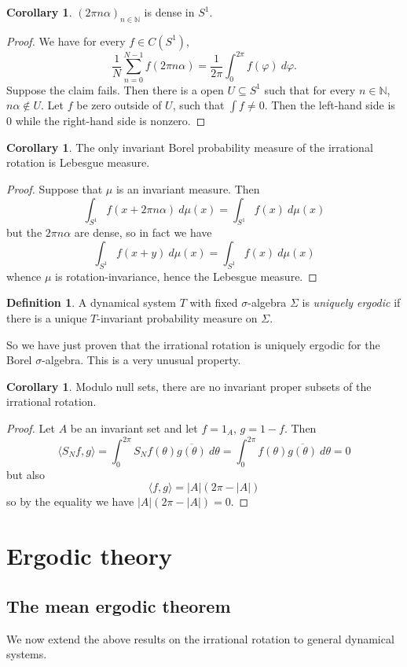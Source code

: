 \documentclass[12pt]{report}
\newcommand{\NN}{\mathbb{N}}
\newcommand{\dfn}[1]{\emph{#1}\index{#1}}
\theoremstyle{definition}
\newtheorem{corollary}[theorem]{Corollary}
\newtheorem{definition}[theorem]{Definition}
\begin{document}
\begin{corollary}
$(2\pi n\alpha)_{n \in \NN}$ is dense in $S^1$.
\end{corollary}
\begin{proof}
We have for every $f \in C(S^1)$,
$$\frac{1}{N} \sum_{n=0}^{N-1} f(2\pi n\alpha) = \frac{1}{2\pi} \int_0^{2\pi} f(\varphi) ~d\varphi.$$
Suppose the claim fails. Then there is a open $U \subseteq S^1$ such that for every $n \in \NN$, $n\alpha \notin U$. Let $f$ be zero outside of $U$, such that $\int f \neq 0$. Then the left-hand side is $0$ while the right-hand side is nonzero.
\end{proof}
\begin{corollary}
The only invariant Borel probability measure of the irrational rotation is Lebesgue measure.
\end{corollary}
\begin{proof}
Suppose that $\mu$ is an invariant measure. Then
$$\int_{S^1} f(x + 2\pi n\alpha) ~d\mu(x) = \int_{S^1} f(x) ~d\mu(x)$$
but the $2\pi n\alpha$ are dense, so in fact we have
$$\int_{S^1} f(x + y) ~d\mu(x) = \int_{S^1} f(x) ~d\mu(x)$$
whence $\mu$ is rotation-invariance, hence the Lebesgue measure.
\end{proof}
\begin{definition}
A dynamical system $T$ with fixed $\sigma$-algebra $\Sigma$ is \dfn{uniquely ergodic} if there is a unique $T$-invariant probability measure on $\Sigma$.
\end{definition}
So we have just proven that the irrational rotation is uniquely ergodic for the Borel $\sigma$-algebra. This is a very unusual property.
\begin{corollary}
Modulo null sets, there are no invariant proper subsets of the irrational rotation.
\end{corollary}
\begin{proof}
Let $A$ be an invariant set and let $f = 1_A$, $g = 1 - f$. Then
$$\langle S_Nf, g\rangle = \int_0^{2\pi} S_Nf(\theta)\overline{g(\theta)} ~d\theta = \int_0^{2\pi} f(\theta)\overline{g(\theta)} ~d\theta = 0$$
but also
$$\langle f, g\rangle = |A|(2\pi - |A|)$$
so by the equality we have $|A|(2\pi - |A|) = 0$.
\end{proof}

\chapter{Ergodic theory}
\section{The mean ergodic theorem}
We now extend the above results on the irrational rotation to general dynamical systems.
\end{document}
